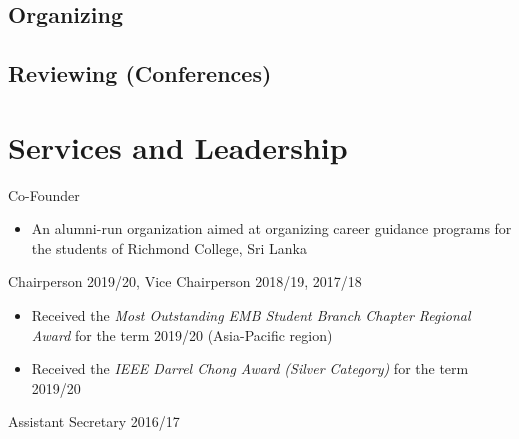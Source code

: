 \documentclass[10pt,a4paper,sans]{moderncv} %
\begin{document}
\subsection{Organizing}

\subsection{Reviewing (Conferences)}


\section{Services and Leadership}
{Co-Founder}{}{}{
  \begin{itemize}
    \item An alumni-run organization aimed at organizing career guidance programs for the students of Richmond College, Sri Lanka
  \end{itemize}
}

{Chairperson 2019/20, Vice Chairperson 2018/19, 2017/18}{}{}{
  \begin{itemize}
    \item Received the \textit{Most Outstanding EMB Student Branch Chapter Regional Award} for the term 2019/20 (Asia-Pacific region)
    \item Received the \textit{IEEE Darrel Chong Award (Silver Category)} for the term 2019/20
  \end{itemize}
}

{Assistant Secretary 2016/17}{}{}{}


\end{document}
